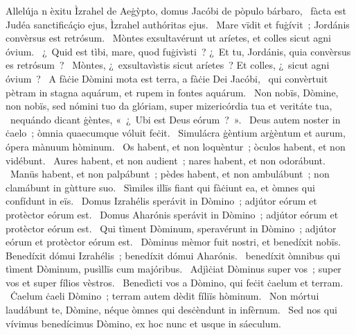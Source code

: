 { Allelúja}
{%
n èxitu Ìzrahel de Aeġỳpto, domus Jacóbi de pòpulo bárbaro, 
~fàcta est Judéa sanctificáçio ejus, Ìzrahel authóritas ejus. 
~Mare vïdit et fuġívit~; Jordánis convèrsus est retrósum. 
~Mòntes exsultavérunt ut aríetes, et colles sicut agni óvium. 
~¿~Quid est tìbi, mare, quod fuġivìsti~? ¿~Et tu, Jordánis, quia convèrsus es retrósum~? 
~Mòntes, ¿~exsultavìstis sicut aríetes~? Et colles, ¿~sicut agni óvium~? 
~A fàċie Dòmini mota est terra, a fàċie Dei Jacóbi, 
~qui convèrtuit pètram in stagna aquárum, et rupem in fontes aquárum. 
~Non nobïs, Dòmine, non nobïs, sed nómini tuo da glóriam, super mizericórdia tua et veritáte tua, 
~nequándo dicant ġèntes, «~¿~Ubi est Deus eórum~?~». 
~Deus autem noster in ċaelo~; òmnia quaecumque vóluit feċit. 
~Simulácra ġèntium arġèntum et aurum, ópera mànuum hòminum. 
~Os habent, et non loquèntur~; òculos habent, et non vidébunt. 
~Aures habent, et non audient~; nares habent, et non odorábunt. 
~Manüs habent, et non palpábunt~; pèdes habent, et non ambulábunt~; non clamábunt in gùtture suo. 
~Sìmiles illïs fiant qui fàċiunt ea, et òmnes qui confídunt in eïs. 
~Domus Izrahélis sperávit in Dòmino~; adjútor eórum et protèctor eórum est. 
~Domus Aharónis sperávit in Dòmino~; adjútor eórum et protèctor eórum est. 
~Qui tìment Dòminum, speravérunt in Dòmino~; adjútor eórum et protèctor eórum est. 
~Dòminus mèmor fuit nostri, et benedíxit nobïs. Benedíxit dómui Izrahélis~; benedíxit dómui Aharónis. 
~benedíxit òmnibus qui tìment Dòminum, pusìllïs cum majóribus. 
~Adjìċiat Dòminus super vos~; super vos et super fílios vèstros. 
~Benedìcti vos a Dòmino, qui feċit ċaelum et terram. 
~Ċaelum ċaeli Dòmino~; terram autem dèdit fíliïs hòminum. 
~Non mórtui laudábunt te, Dòmine, néque òmnes qui desċèndunt in infèrnum. 
~Sed nos qui vívimus benedícimus Dòmino, ex hoc nunc et usque in sáeculum. 
}

